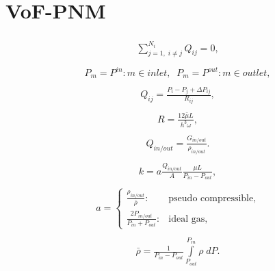 \documentclass[a4paper,12pt]{extreport}
\begin{document}
\newpage
\section*{VoF-PNM}

\begin{eqnarray}
\label{one_phase} 
\begin{gathered}
\sum^{N_{i}}_{j=1, \; i\neq j} Q_{ij} = 0,
\end{gathered}
\end{eqnarray}
%
\begin{eqnarray}
\begin{gathered}
\label{press_bound}
P_{m} = P^{in}   : m \in inlet, \;\;
P_{m} = P^{out}   :m \in outlet,
\end{gathered}
\end{eqnarray}
%
 \begin{eqnarray}
\begin{gathered}
\label{eq:twophase_mass_flux}
Q_{ij} = \frac{P_{i} - P_{j} + \Delta P_{ij}}{R_{ij}},
\end{gathered}
\end{eqnarray}
%
 \begin{eqnarray}
\begin{gathered}
\label{eq:twophase_mass_hydr_conductance}
R = \frac{12 \bar{\mu} L}{h^{3} \omega},
\end{gathered}
\end{eqnarray}
%
\begin{eqnarray}
\begin{gathered}
Q_{in/out} = \frac{G_{in/out}}{\rho_{in/out}}.
\end{gathered}
\end{eqnarray}
%
\begin{eqnarray}
\begin{gathered}
k = a \frac{Q_{in/out}}{A} \frac{\mu L}{P_{in} - P_{out}},
\end{gathered}
\end{eqnarray}
%
\begin{eqnarray}
\begin{gathered}
a =\begin{cases}
\frac{\rho_{in/out}}{\bar{\rho}}: &\text{pseudo compressible},\\
\frac{2P_{in/out}}{P_{in} + P_{out}}: &\text{ideal gas},
\end{cases}
\end{gathered}
\end{eqnarray}
%
\begin{eqnarray}
\begin{gathered}
\bar{\rho}=\frac{1}{P_{in}-P_{out}} \int\limits^{P_{in}}_{P_{out}}\rho \; dP.
\end{gathered}
\end{eqnarray}
\end{document}
